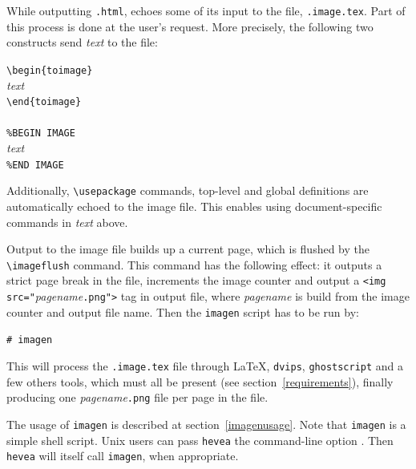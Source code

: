 While outputting \texttt{.html}, \hevea{} echoes some
of its input to the  file,
\texttt{.image.tex}.
Part of this process is done at the user's request.
More precisely, the following two constructs
send \textit{text} to the  file:
\begin{flushleft}
\verb+\begin{toimage}+\\
\textit{text}\\
\verb+\end{toimage}+\\
~\\
\verb+%BEGIN IMAGE+\\
\textit{text}\\
\verb+%END IMAGE+
\end{flushleft}
Additionally, \verb+\usepackage+ commands, top-level and global
definitions
are automatically echoed to the image file. This enables using
document-specific commands in \textit{text} above.


Output to the image file builds up a current page, which is flushed
by the \verb+\imageflush+ command.
This command has the following effect:  it outputs a strict page break
in the  file, increments the image counter and
output a \verb+<img src="+\textit{pagename}\verb+.png">+ tag in \hevea{}
output file, where \textit{pagename} is build from the image counter
and \hevea{} output file name.
Then the \verb+imagen+ script has to be run by:
\begin{flushleft}
\verb+# imagen+ 
\end{flushleft}
\noindent This will process the \texttt{.image.tex}
file through \LaTeX,
\texttt{dvips}, \texttt{ghostscript} and a few others tools, which must all be
present  (see section~\ref{requirements}), finally producing one
\textit{pagename}\texttt{.png} file per page in the 
file.

The  usage of \verb+imagen+  is described at
section~\ref{imagenusage}. Note that \texttt{imagen} is a simple shell
script. Unix users can pass \texttt{hevea} the command-line option
. Then \texttt{hevea} will
itself call \texttt{imagen}, when appropriate.





